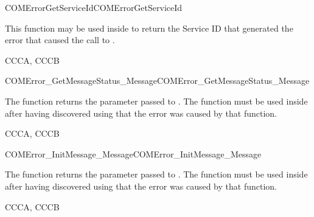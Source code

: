 
\begin{function_nopb2}{COMErrorGetServiceId}{COMErrorGetServiceId}
  \begin{fundescription}
    This function may be used inside  to return the
    Service ID that generated the error that caused the call to
    . 
  \end{fundescription}
  \begin{funreturn}
  \end{funreturn}
  \begin{funconformance}
    CCCA, CCCB
  \end{funconformance}
\end{function_nopb2}


\begin{function_nopb2}{COMError\_GetMessageStatus\_Message}{COMError_GetMessageStatus_Message}
  \begin{fundescription}
    The function returns the  parameter passed to
    . The function must be used inside  
     after having discovered using  that the error 
     was caused by that function.
  \end{fundescription}
  \begin{funreturn}
  \end{funreturn}
  \begin{funconformance}
   CCCA, CCCB
  \end{funconformance}
\end{function_nopb2}

\begin{function_nopb2}{COMError\_InitMessage\_Message}{COMError_InitMessage_Message}
  \begin{fundescription}
    The function returns the  parameter passed to
    . The function must be used inside  
     after having discovered using  that the error 
     was caused by that function.
  \end{fundescription}
  \begin{funreturn}
  \end{funreturn}
  \begin{funconformance}
   CCCA, CCCB
  \end{funconformance}
\end{function_nopb2}

